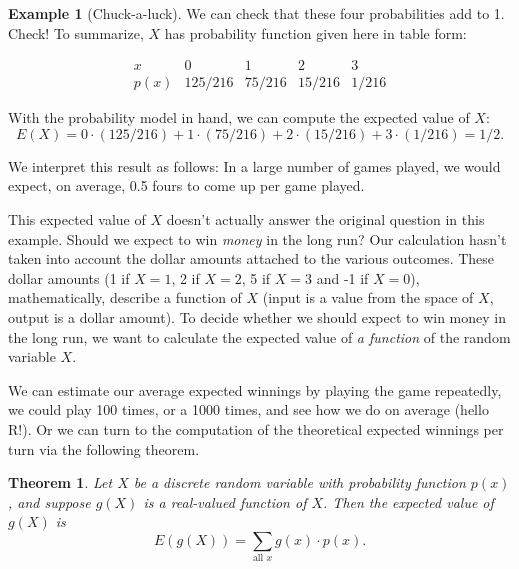 \documentclass[
]{book}
\newtheorem{theorem}{Theorem}[chapter]
\theoremstyle{definition}
\theoremstyle{definition}
\newtheorem{example}{Example}[chapter]
\theoremstyle{definition}
\theoremstyle{definition}
\theoremstyle{remark}
\begin{document}
\begin{example}[Chuck-a-luck]
We can check that these four probabilities add to 1. Check! To summarize, \(X\) has probability function given here in table form:

\[
\begin{array}{c|c|c|c|c}
x & 0 & 1 & 2 & 3 \\ \hline
p(x) & 125/216 & 75/216 & 15/216 & 1/216 
\end{array}
\]

With the probability model in hand, we can compute the expected value of \(X\): \[E(X) = 0 \cdot (125/216) + 1 \cdot (75/216) + 2 \cdot (15/216) + 3 \cdot (1/216) = 1/2.\]

We interpret this result as follows: In a large number of games played, we would expect, on average, 0.5 fours to come up per game played.

This expected value of \(X\) doesn't actually answer the original question in this example. Should we expect to win \emph{money} in the long run? Our calculation hasn't taken into account the dollar amounts attached to the various outcomes. These dollar amounts (1 if \(X = 1\), 2 if \(X = 2\), 5 if \(X = 3\) and -1 if \(X = 0\)), mathematically, describe a function of \(X\) (input is a value from the space of \(X\), output is a dollar amount). To decide whether we should expect to win money in the long run, we want to calculate the expected value of \emph{a function} of the random variable \(X\).

We can estimate our average expected winnings by playing the game repeatedly, we could play 100 times, or a 1000 times, and see how we do on average (hello R!). Or we can turn to the computation of the theoretical expected winnings per turn via the following theorem.
\end{example}

\begin{theorem}
\protect\hypertarget{thm:EV-discrete-fcnRV}{}\label{thm:EV-discrete-fcnRV}Let \(X\) be a discrete random variable with probability function \(p(x)\), and suppose \(g(X)\) is a real-valued function of \(X\). Then the expected value of \(g(X)\) is \[E(g(X)) = \sum_{\text{all }x} g(x) \cdot p(x).\]
\end{theorem}
\end{document}
